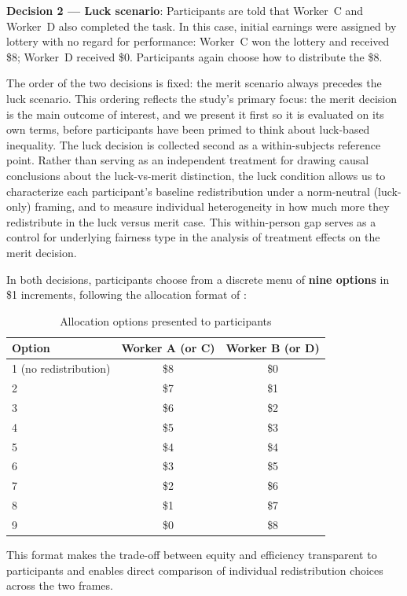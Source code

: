 \documentclass[12pt]{article}
\begin{document}
\textbf{Decision 2 — Luck scenario}: Participants are told that Worker~C and Worker~D also completed the task. In this case, initial earnings were assigned by lottery with no regard for performance: Worker~C won the lottery and received \$8; Worker~D received \$0. Participants again choose how to distribute the \$8.

The order of the two decisions is fixed: the merit scenario always precedes the luck scenario. This ordering reflects the study's primary focus: the merit decision is the main outcome of interest, and we present it first so it is evaluated on its own terms, before participants have been primed to think about luck-based inequality. The luck decision is collected second as a within-subjects reference point. Rather than serving as an independent treatment for drawing causal conclusions about the luck-vs-merit distinction, the luck condition allows us to characterize each participant's baseline redistribution under a norm-neutral (luck-only) framing, and to measure individual heterogeneity in how much more they redistribute in the luck versus merit case. This within-person gap serves as a control for underlying fairness type in the analysis of treatment effects on the merit decision.

In both decisions, participants choose from a discrete menu of \textbf{nine options} in \$1 increments, following the allocation format of \citet{cappelen2007}:

\begin{table}[h]
\centering
\caption{Allocation options presented to participants}
\label{tab:options}
\begin{tabular}{lcc}
\toprule
Option & Worker A (or C) & Worker B (or D) \\
\midrule
1 (no redistribution) & \$8 & \$0 \\
2 & \$7 & \$1 \\
3 & \$6 & \$2 \\
4 & \$5 & \$3 \\
5 & \$4 & \$4 \\
6 & \$3 & \$5 \\
7 & \$2 & \$6 \\
8 & \$1 & \$7 \\
9 & \$0 & \$8 \\
\bottomrule
\end{tabular}
\end{table}

This format makes the trade-off between equity and efficiency transparent to participants and enables direct comparison of individual redistribution choices across the two frames.
\end{document}
